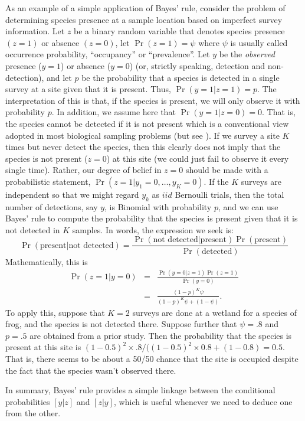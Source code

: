 As an example of a simple application of Bayes' rule,
consider the problem of determining species presence at a sample
location based on imperfect survey information. Let $z$ be a binary
random variable that denotes species presence $(z=1)$ or absence
$(z=0)$, let $\Pr(z=1) = \psi$ where $\psi$ is usually called
occurrence probability, ``occupancy'' \citep{mackenzie_etal:2002} or ``prevalence''.
Let $y$ be the {\it observed} presence
($y=1$) or absence ($y=0$) (or, strictly speaking, detection and non-detection), and let $p$ be the probability that a
species is detected in a single survey at a site given that it is
present. Thus, $\Pr(y=1|z=1)=p$. The interpretation of this is that,
if the species is present, we will only observe it with
probability $p$. In addition, we assume here that $\Pr(y=1|z=0) =
0$. That is, the species cannot be detected if it is not present which
is a conventional view adopted in most biological sampling problems (but
see \citet{royle_link:2006}).
If we survey a site $K$ times but never detect the species,
then this clearly does not imply that the species is not present
($z=0$) at this site (we could just fail to observe it every single time). Rather, our degree of belief in $z=0$ should be
made with a probabilistic statement,
$\Pr(z=1|y_1=0,\ldots,y_{K}=0)$. If the $K$ surveys are independent so
that we might regard $y_{k}$ as $iid$ Bernoulli trials, then the total
number of detections, say $y$, is Binomial with probability $p$, and
we can use Bayes' rule to compute the probability that the species is present
given that it is not detected in $K$ samples. In words, the expression
we seek is:
\[
\Pr(\mbox{present} | \mbox{not detected}) = \frac{\Pr(\mbox{not detected} |
  \mbox{present})\Pr(\mbox{present})}{\Pr(\mbox{detected})}
\]
Mathematically, this is
\begin{eqnarray*}
\Pr(z=1|y=0) &= &\frac{\Pr(y=0|z=1)\Pr(z=1)}{\Pr(y=0) } \\
             &= & \frac{(1-p)^{K} \psi}{ (1-p)^K \psi + (1-\psi) }.
\end{eqnarray*}
To apply this,
suppose that $K=2$ surveys are done at a wetland for a species of
frog, and the species is not detected there. Suppose further that $\psi
= .8$ and $p = .5$ are obtained from a prior study.  Then the
probability that the species is present at this site is
$(1-0.5)^2 \times.8/((1-0.5)^2 \times 0.8 + (1-0.8) = 0.5$. 
That is, there seems to be about a
50/50 chance that the site is occupied despite the fact that the
species wasn't observed there.

In summary, Bayes' rule provides a simple linkage between the
conditional probabilities $[y|z]$ and $[z|y]$, which is useful whenever
we need to deduce one from the other.

